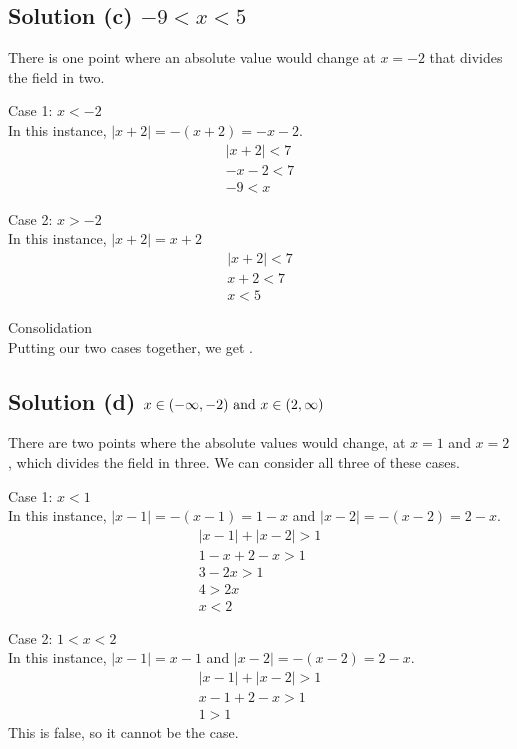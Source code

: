 \documentclass[12pt]{report}
\begin{document}
\subsection{Solution (c) $-9 < x < 5$}
There is one point where an absolute value would change at $x = -2$ that divides the field in two.

Case 1: $x < -2$\\
In this instance, $|x + 2| = -(x + 2) = -x - 2$.
\begin{gather}
    |x + 2| < 7\\
    -x - 2 < 7\\
    -9 < x
\end{gather}

Case 2: $x > -2$\\
In this instance, $|x + 2| = x + 2$
\begin{gather}
    |x + 2| < 7\\
    x + 2 < 7\\
    x < 5
\end{gather}

Consolidation\\
Putting our two cases together, we get .

\subsection{Solution (d) $x \in (-\infty, -2) \text{ and } x \in (2, \infty)$}
There are two points where the absolute values would change, at $x = 1$ and $x = 2$, which divides the field in three.
We can consider all three of these cases.

Case 1: $x < 1$\\
In this instance, $|x - 1| = -(x - 1) = 1 - x$ and $|x - 2| = -(x - 2) = 2 - x$.
\begin{gather}
    \left|x - 1\right| + \left|x - 2\right| > 1\\
    1 - x + 2 - x > 1\\
    3 - 2x > 1\\
    4 > 2x\\
    x < 2
\end{gather}

Case 2: $1 < x < 2$\\
In this instance, $|x - 1| = x - 1$ and $|x - 2| = -(x - 2) = 2 - x$.
\begin{gather}
    \left|x - 1\right| + \left|x - 2\right| > 1\\
    x - 1 + 2 - x > 1\\
    1 > 1
\end{gather}
This is false, so it cannot be the case.
\end{document}
